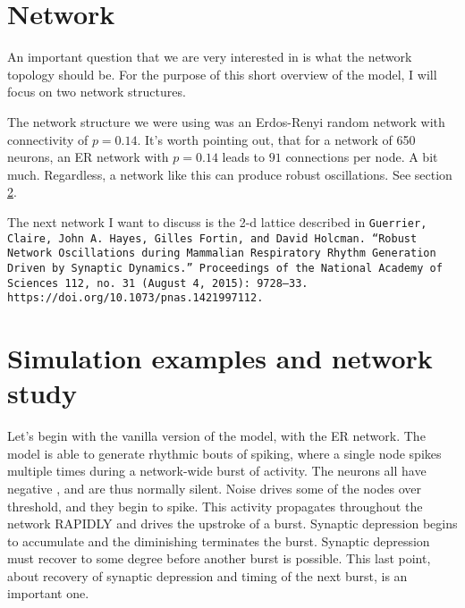 \documentclass{article}
\begin{document}
\section{Network}
An important question that we are very interested in is what the network topology should be. For the purpose of this short overview of the model, I will focus on two network structures.

\dskip

The network structure we were using was an Erdos-Renyi random network with connectivity of $p=0.14$. It's worth pointing out, that for a network of 650 neurons, an ER network with $p=0.14$ leads to $91$ connections per node. A bit much. Regardless, a network like this can produce robust oscillations. See section \ref{examplesections}.

\dskip
The next network I want to discuss is the 2-d lattice described in \dskip
\texttt{Guerrier, Claire, John A. Hayes, Gilles Fortin, and David Holcman. “Robust Network Oscillations during Mammalian Respiratory Rhythm Generation Driven by Synaptic Dynamics.” Proceedings of the National Academy of Sciences 112, no. 31 (August 4, 2015): 9728–33. https://doi.org/10.1073/pnas.1421997112.}

\section{Simulation examples and network study}\label{examplesections}
Let's begin with the vanilla version of the model, with the ER network. The model is able to generate rhythmic bouts of spiking, where a single node spikes multiple times during a network-wide burst of activity. The neurons all have negative \Iappi, and are thus normally silent. Noise drives some of the nodes over threshold, and they begin to spike. This activity propagates throughout the network RAPIDLY and drives the upstroke of a burst. Synaptic depression begins to accumulate and the diminishing \Iapp terminates the burst. Synaptic depression must recover to some degree before another burst is possible. This last point, about recovery of synaptic depression and timing of the next burst, is an important one.
\end{document}
